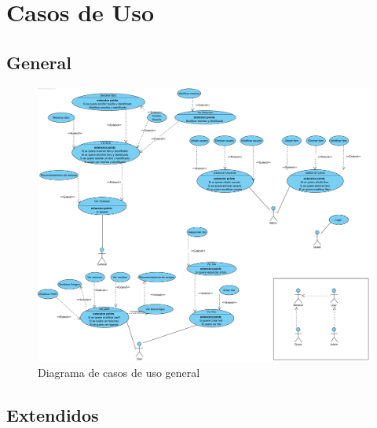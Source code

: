 ﻿\documentclass{report}
\begin{document}
    \chapter{Casos de Uso}
        \section{General}
            \begin{figure}[H]
                \centering
                \includegraphics[scale=0.3]{img/casos_uso/General.png}
                \caption{Diagrama de casos de uso general}
            \end{figure}
        \clearpage
        \section{Extendidos}
\end{document}
